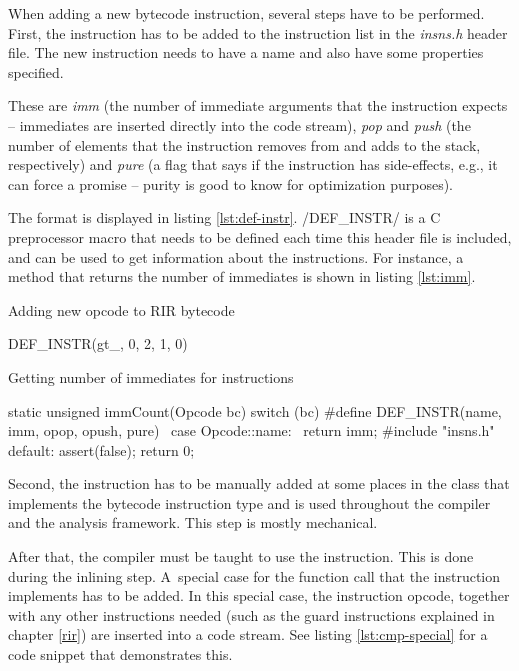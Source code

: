 When adding a new bytecode instruction, several steps have to be performed. First, the instruction has to be added to the instruction list in the \emph{insns.h} header file. The new instruction needs to have a name and also have some properties specified.

These are \emph{imm} (the number of immediate arguments that the instruction expects -- immediates are inserted directly into the code stream), \emph{pop} and \emph{push} (the number of elements that the instruction removes from and adds to the stack, respectively) and \emph{pure} (a flag that says if the instruction has side-effects, e.g., it can force a promise -- purity is good to know for optimization purposes).

The format is displayed in listing \ref{lst:def-instr}. \cinline/DEF_INSTR/ is a C preprocessor macro that needs to be defined each time this header file is included, and can be used to get information about the instructions. For instance, a method that returns the number of immediates is shown in listing \ref{lst:imm}.

\begin{listing}[htbp]
  \caption{\label{lst:def-instr}Adding new opcode to RIR bytecode}
  \begin{ccode}
DEF_INSTR(gt_, 0, 2, 1, 0)
  \end{ccode}
\end{listing}

\begin{listing}[htbp]
  \caption{\label{lst:imm}Getting number of immediates for instructions}
  \begin{cppcode}
static unsigned immCount(Opcode bc) {
    switch (bc) {
#define DEF_INSTR(name, imm, opop, opush, pure)                       \
    case Opcode::name:                                                \
        return imm;
#include "insns.h"
    default:
        assert(false);
        return 0;
    }
}
  \end{cppcode}
\end{listing}

Second, the instruction has to be manually added at some places in the class that implements the bytecode instruction type and is used throughout the compiler and the analysis framework. This step is mostly mechanical.

After that, the compiler must be taught to use the instruction. This is done during the inlining step. A~special case for the function call that the instruction implements has to be added. In this special case, the instruction opcode, together with any other instructions needed (such as the guard instructions explained in chapter \ref{rir}) are inserted into a code stream. See listing \ref{lst:cmp-special} for a code snippet that demonstrates this.

